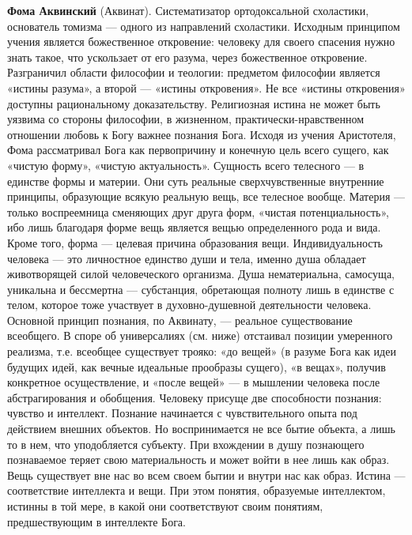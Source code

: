 \documentclass[12pt]{article}
\begin{document}
\textbf{Фома  Аквинский}  (Аквинат).  Систематизатор  ортодоксальной  схоластики,  основатель  томизма 
---  одного  из
направлений схоластики. Исходным принципом учения является божественное откровение: человеку для своего спасения
нужно знать такое, что ускользает от его разума, через божественное откровение.
Разграничил области философии и теологии: предметом философии является «истины разума», а второй --- «истины откровения».
Не все «истины откровения» доступны рациональному доказательству. Религиозная истина не может быть
уязвима со стороны философии, в
жизненном, практически-нравственном отношении любовь к Богу важнее познания Бога.
Исходя из учения Аристотеля, Фома рассматривал Бога как первопричину и конечную цель всего сущего,
как «чистую
форму», «чистую актуальность». Сущность всего телесного --- в единстве формы и материи. Они суть реальные
сверхчувственные внутренние принципы, образующие всякую реальную вещь, все телесное вообще.
Материя ---
только воспреемница сменяющих друг друга форм, «чистая потенциальность», ибо лишь благодаря форме вещь
является вещью определенного рода и вида. Кроме того, форма --- целевая причина образования вещи.
Индивидуальность человека --- это личностное единство души и тела, именно душа обладает животворящей
силой  человеческого  организма.  Душа  нематериальна,  самосуща,  уникальна  и  бессмертна ---
субстанция,
обретающая полноту лишь в единстве с телом, которое  тоже участвует в духовно-душевной деятельности
человека.
Основной принцип познания, по Аквинату, --- реальное существование всеобщего. В споре об универсалиях (см.
ниже) отстаивал позиции умеренного реализма, т.е. всеобщее существует трояко: «до вещей» (в разуме Бога как
идеи будущих идей, как вечные идеальные прообразы сущего), «в вещах», получив конкретное осуществление, и
«после вещей» --- в мышлении человека после абстрагирования и обобщения. Человеку присуще две способности
познания: чувство и интеллект. Познание начинается с чувствительного опыта под действием
внешних объектов. Но
воспринимается не все бытие объекта, а лишь то в нем, что уподобляется субъекту. При вхождении в душу
познающего познаваемое теряет свою материальность и может войти в нее лишь как образ. Вещь существует вне
нас во всем своем бытии и внутри нас как образ.
Истина --- соответствие интеллекта и вещи. При этом понятия, образуемые интеллектом, истинны в той мере, в
какой они соответствуют своим понятиям, предшествующим в интеллекте Бога.
\end{document}
